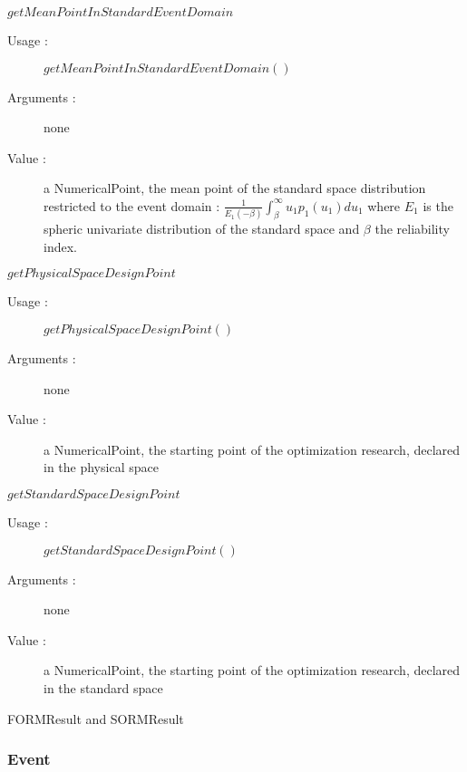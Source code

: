 \begin{description}
\begin{description}
  \item $getMeanPointInStandardEventDomain$
    \begin{description}
    \item[Usage :] $getMeanPointInStandardEventDomain()$
    \item[Arguments :] none
    \item[Value :]  a NumericalPoint, the mean point of the standard space distribution restricted to the event domain : $\displaystyle \frac{1}{E_1(-\beta)}\int_{\beta}^{\infty} u_1 p_1(u_1)du_1$ where $E_1$ is the spheric univariate distribution of the standard space and $\beta$ the reliability index.
    \end{description}

  \item $getPhysicalSpaceDesignPoint$
    \begin{description}
    \item[Usage :] $getPhysicalSpaceDesignPoint()$
    \item[Arguments :] none
    \item[Value :]  a NumericalPoint, the starting point of the optimization research, declared in the physical space
    \end{description}
    \bigskip
  \item $getStandardSpaceDesignPoint$
    \begin{description}
    \item[Usage :] $getStandardSpaceDesignPoint()$
    \item[Arguments :] none
    \item[Value :]  a NumericalPoint, the starting point of the optimization research, declared in the standard space
    \end{description}
    \bigskip
  \end{description}

\item[Derivative Classes :] FORMResult and SORMResult


\end{description}


\newpage \subsubsection{Event}



